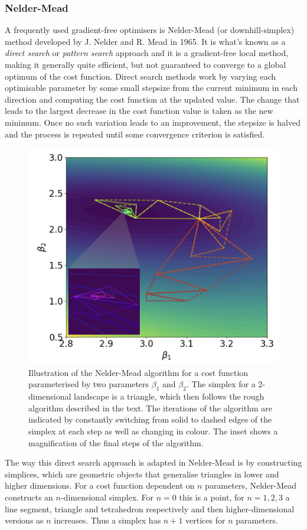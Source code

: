 \subsubsection{Nelder-Mead}\label{sec:3.1.3.1_Nelder_Mead}

A frequently used gradient-free optimisers is Nelder-Mead (or downhill-simplex) method \cite{nelder_simplex_1965} developed by J. Nelder and R. Mead in 1965. It is what's known as a \emph{direct search} or \emph{pattern search} approach and it is a gradient-free local method, making it generally quite efficient, but not guaranteed to converge to a global optimum of the cost function. Direct search methods work by varying each optimisable parameter by some small stepsize from the current minimum in each direction and computing the cost function at the updated value. The change that leads to the largest decrease in the cost function value is taken as the new minimum. Once no such variation leads to an improvement, the stepsize is halved and the process is repeated until some convergence criterion is satisfied.

\begin{figure}[t]
\centering
\includegraphics[width=0.6\linewidth]{images/nelder_mead_illustration.png} \caption[Visualising the Nelder-Mead optimisation algorithm.]{Illustration of the Nelder-Mead algorithm for a cost function parameterised by two parameters $\beta_1$ and $\beta_2$. The simplex for a 2-dimensional landscape is a triangle, which then follows the rough algorithm described in the text. The iterations of the algorithm are indicated by constantly switching from solid to dashed edges of the simplex at each step as well as changing in colour. The inset shows a magnification of the final steps of the algorithm.}\label{fig:nelder_mead}
\end{figure}

The way this direct search approach is adapted in Nelder-Mead is by constructing simplices, which are geometric objects that generalise triangles in lower and higher dimensions. For a cost function dependent on $n$ parameters, Nelder-Mead constructs an $n$-dimensional simplex. For $n=0$ this is a point, for $n=1,2,3$ a line segment, triangle and tetrahedron respectively and then higher-dimensional versions as $n$ increases. Thus a simplex has $n+1$ vertices for $n$ parameters. 

